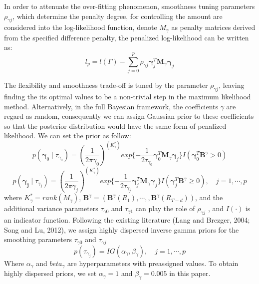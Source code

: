 \documentclass[
journal=jacsat, %
manuscript=article]{achemso}
\begin{document}
\begin{CJK*}{UTF8}{song}
In order to attenuate the over-fitting phenomenon, smoothness tuning parameters $\rho_{\gamma j}$, which determine the penalty degree, for controlling the amount are considered into the log-likelihood function, denote $M_{\gamma}$ as penalty matrices derived from the specified difference penalty, the penalized log-likelihood can be written as:
\begin{equation}
	 l_p = l(\Gamma) - \sum_{j=0}^p \rho_{\gamma j} \bm{\gamma}_j^T \bm{M}_ \gamma \bm{\gamma}_j
\end{equation}

The flexibility and smoothness trade-off is tuned by the parameter $\rho_{\gamma j}$, leaving finding the its optimal values to be a non-trivial step in the maximum likelihood method. Alternatively, in the full Bayesian framework, the coefficients $\gamma$ are regard as random, consequently we can assign Gaussian prior to these coefficients so that the posterior distribution would have the same form of penalized likelihood. We can set the prior as follow:
\begin{equation}
	p(\bm{\gamma}_0 \mid \tau_{\gamma_0}) = (\frac{1}{2 \pi \gamma_0})^{(K_\gamma ^ *)} exp\{-\frac{1}{2 \tau_{\gamma_0} } \bm{\gamma}_0^T \bm{M}_\gamma \bm{\gamma}_j \}I(\bm{\gamma}_0^T \bm{B}^\gamma > 0)
\end{equation}
\begin{equation}
	p(\bm{\gamma_j} \mid \tau_{\gamma_j}) = (\frac{1}{2 \pi \gamma_j})^{(K_{\gamma}^*)} exp \{ -\frac{1}{2\tau_{\gamma_j}}\bm{\gamma}_j^T \bm{M}_\gamma \bm{\gamma}_j \}I(\bm{\gamma}_j^T \bm{B}^\gamma \geq 0),  \quad   j=1, \cdots ,p
\end{equation}
where $K_{\gamma}^{*}=rank(M_{\gamma})$, $\bm{B}^{\gamma} = (\bm{B}^{\gamma}(R_1), \cdots, , \bm{B}^{\gamma}(R_{T-d}))$, and the additional variance parameters $\tau_{\gamma 0}$ and $\tau_{\gamma 1}$ can play the role of $\rho_{\gamma j}$ , and $I(\cdot)$ is an indicator function. Following the existing literature (Lang and Brezger, 2004; Song and Lu, 2012), we assign highly dispersed inverse gamma priors for the smoothing parameters $\tau_{\gamma 0}$ and $\tau_{\gamma j}$
\begin{equation}
	p(\tau_{\gamma_j})=IG(\alpha_{\gamma}, \beta_{\gamma}), \quad j=1,\cdots,p
\end{equation}
Where $\alpha_{\gamma}$ and $beta_{\gamma}$ are hyperparameters with preassigned values. To obtain highly dispersed priors, we set $\alpha_{\gamma} = 1$ and $\beta_{\gamma} = 0.005$ in this paper.


\end{CJK*}
\end{document}
